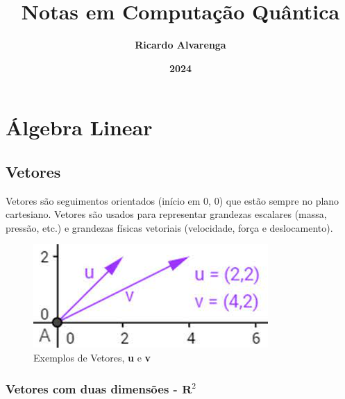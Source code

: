 \documentclass[12pt]{article}
\begin{document}
	
\title{\textbf{{\Huge Notas em Computação Quântica}}} %
\author{\textbf{{\Large Ricardo Alvarenga}}} %
\date{\textbf{{\Large 2024}}} %
\maketitle %
\thispagestyle{empty} %
\newpage

\pagestyle{fancy}
\setcounter{page}{1} %
\tableofcontents %
\newpage

\listoffigures %
\newpage


\pagestyle{fancy}
\fancyfoot[C]{\thepage} %
\newpage

\setcounter{page}{1} %
\pagestyle{fancy}
\fancyfoot[C]{\thepage}


\section{Álgebra Linear}

\subsection{Vetores}

Vetores são seguimentos orientados (início em 0, 0) que estão sempre no plano cartesiano. Vetores são usados para representar grandezas escalares (massa, pressão, etc.) e grandezas físicas vetoriais (velocidade, força e deslocamento).

\begin{figure}[H]
	\centering
	\includegraphics[width=.5\linewidth]{figuras/vetores_01}
	\caption[Vetores \textbf{u} e \textbf{v}]{Exemplos de Vetores, \textbf{u} e \textbf{v}}
	\label{fig:vetores01}
\end{figure}

\subsubsection{Vetores com duas dimensões - \( \mathbf{R}^{2} \)}
\end{document}
